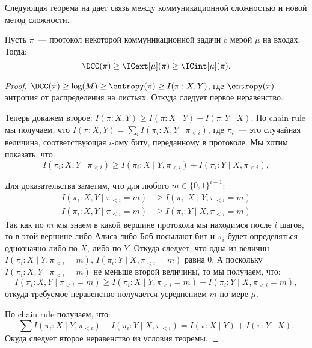 Следующая теорема на дает связь между коммуникационной сложностью и новой метод сложности.

\begin{theorem}
    Пусть $\pi$~--- протокол некоторой коммуникационной задачи c мерой $\mu$ на входах. Тогда:
    $$
        \DCC(\pi) \ge \ICext[\mu](\pi) \ge \ICint[\mu](\pi).
    $$ 
\end{theorem}

\begin{proof}
    $\DCC(\pi) \ge \log(M) \ge \entropy(\pi) \ge I(\pi : X, Y)$, где $\entropy(\pi)$~--- энтропия от
    распределения на листьях. Откуда следует первое неравенство.
    
    Теперь докажем второе: $I(\pi : X, Y) \ge I(\pi : X \mid Y) + I(\pi : Y \mid X)$. По chain rule мы
    получаем, что $I(\pi : X, Y) = \sum\limits_i I(\pi_i : X, Y \mid \pi_{< i})$, где $\pi_i$~--- это
    случайная величина, соответствующая $i$-ому биту, переданному в протоколе. Мы хотим показать, что:
    $$
        I(\pi_i : X, Y \mid \pi_{< i}) \ge I(\pi_i : X \mid Y, \pi_{< i}) +
        I(\pi_i : Y \mid X, \pi_{< i}),
    $$

    Для доказательства заметим, что для любого $m \in \{0, 1\}^{i - 1}$:
    \begin{align*}
      I(\pi_i : X, Y \mid \pi_{< i} = m) &\ge I(\pi_i : X \mid Y, \pi_{< i} = m) \\
      I(\pi_i : X, Y \mid \pi_{< i} = m) &\ge I(\pi_i : Y \mid X, \pi_{< i} = m)
    \end{align*}
    Так как по $m$ мы знаем в какой вершине протокола мы находимся после $i$ шагов, то в этой
    вершине либо Алиса либо Боб посылают бит и $\pi_i$ будет определяться однозначно либо по $X$, либо по
    $Y$. Откуда следует, что одна из величин $I(\pi_i : X \mid Y, \pi_{< i} = m)$, $I(\pi_i : Y \mid X,
    \pi_{< i} = m)$ равна $0$. А поскольку $I(\pi_i : X, Y \mid \pi_{< i} = m)$ не меньше второй величины, то мы
    получаем, что:
    $$
        I(\pi_i : X, Y \mid \pi_{< i} = m) \ge I(\pi_i : X \mid Y, \pi_{< i} = m) +
        I(\pi_i : Y \mid X, \pi_{< i} = m),
    $$
    откуда требуемое неравенство получается усреднением $m$ по мере $\mu$.

    По chain rule получаем, что:
    $$
        \sum I(\pi_i : X \mid Y, \pi_{< i}) + I(\pi_i : Y \mid X, \pi_{< i}) =
        I(\pi : X \mid Y) + I(\pi : Y \mid X).
    $$ 
    Окуда следует второе неравенство из условия теоремы.
\end{proof}

